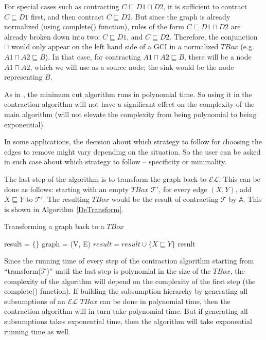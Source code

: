 \documentclass{sfuthesis}
\theoremstyle{plain}
\theoremstyle{definition}
\begin{document}
For special cases such as contracting $C \sqsubseteq D1 \sqcap D2$, it is sufficient to contract $C \sqsubseteq D1$ first, and then contract $C \sqsubseteq D2$. But since the graph is already normalized (using complete() function), rules of the form $C \sqsubseteq D1 \sqcap D2$ are already broken down into two: $C \sqsubseteq D1$, and $C \sqsubseteq D2$. Therefore, the conjunction $\sqcap$ would only appear on the left hand side of a GCI in a normalized $TBox$ (e.g. $A1 \sqcap A2 \sqsubseteq B$). In that case, for contracting $A1 \sqcap A2 \sqsubseteq B$, there will be a node $A1 \sqcap A2$, which we will use as a source node; the sink would be the node representing $B$. 

As in \cite{alg}, the minimum cut algorithm runs in polynomial time. So using it in the contraction algorithm will not have a significant effect on the complexity of the main algorithm (will not elevate the complexity from being polynomial to being exponential). 

In some applications, the decision about which strategy to follow for choosing the edges to remove might vary depending on the situation. So the user can be asked in such case about which strategy to follow -- specificity or minimality. 

The last step of the algorithm is to transform the graph back to $\mathcal{EL}$. This can be done as follows: starting with an empty $TBox$ $\mathcal{T'}$, for every edge $(X, Y)$, add $X \sqsubseteq Y$ to $\mathcal{T'}$. The resulting $TBox$ would be the result of contracting $\mathcal{T}$ by $\mathbb{A}$. This is shown in Algorithm \ref{DeTransform}.

\begin{algorithm}
\caption{Transforming a graph back to a $TBox$}
\label{DeTransform}
\begin{algorithmic}[1]
\State result = $\{\}$
\State graph = (V, E)
\State $result = result \cup \{X \sqsubseteq Y\}$
\EndFor
\State \Return result
\EndFunction
\end{algorithmic}
\end{algorithm}

Since the running time of every step of the contraction algorithm starting from ``transform($ \mathcal{T} $)'' until the last step is polynomial in the size of the $TBox$, the complexity of the algorithm will depend on the complexity of the first step (the complete() function). If building the subsumption hierarchy by generating all subsumptions of an $\mathcal{EL}$ $TBox$ can be done in polynomial time, then the contraction algorithm will in turn take polynomial time. But if generating all subsumptions takes exponential time, then the algorithm will take exponential running time as well.
\end{document}
